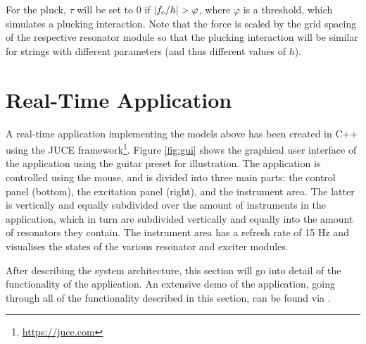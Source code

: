 \documentclass{article}
\begin{document}
For the pluck, $\tau$ will be set to 0 if $|f_{\text{e}} / h| > \varphi$, where $\varphi$ is a threshold, which simulates a plucking interaction. Note that the force is scaled by the grid spacing of the respective resonator module so that the plucking interaction will be similar for strings with different parameters (and thus different values of $h$). 

\section{Real-Time Application}\label{sec:application}
A real-time application implementing the models above has been created in C++ using the JUCE framework\footnote{\url{https://juce.com}}. Figure \ref{fig:gui} shows the graphical user interface of the application using the guitar preset for illustration. The application is controlled using the mouse, and is divided into three main parts: the control panel (bottom), the excitation panel (right), and the instrument area. The latter is vertically and equally subdivided over the amount of instruments in the application, which in turn are subdivided vertically and equally into the amount of resonators they contain. The instrument area has a refresh rate of 15 Hz and visualises the states of the various resonator and exciter modules.  

After describing the system architecture, this section will go into detail of the functionality of the application.
An extensive demo of the application, going through all of the functionality described in this section, can be found via \cite{demo}.
\end{document}
